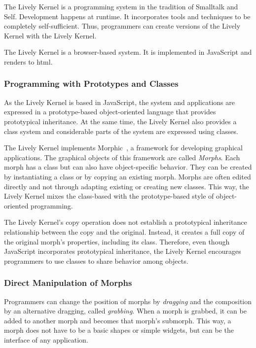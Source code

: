 The Lively Kernel is a programming system in the tradition of Smalltalk and Self.
Development happens at runtime.
It incorporates tools and techniques to be completely self-sufficient.
Thus, programmers can create versions of the Lively Kernel with the Lively Kernel.

The Lively Kernel is a browser-based system.
It is implemented in JavaScript and renders to \ac{html}.

\subsubsection{Programming with Prototypes and Classes}

As the Lively Kernel is based in JavaScript, the system and applications are expressed in a prototype-based object-oriented language that provides prototypical inheritance.
At the same time, the Lively Kernel also provides a class system and considerable parts of the system are expressed using classes.

The Lively Kernel implements Morphic~\cite{Maloney1995Mor}, a framework for developing graphical applications.
The graphical objects of this framework are called \emph{Morphs}.
Each morph has a class but can also have object-specific behavior.
They can be created by instantiating a class or by copying an existing morph.
Morphs are often edited directly and not through adapting existing or creating new classes.
This way, the Lively Kernel mixes the class-based with the prototype-based style of object-oriented programming.

The Lively Kernel's copy operation does not establish a prototypical inheritance relationship between the copy and the original.
Instead, it creates a full copy of the original morph's properties, including its class.
Therefore, even though JavaScript incorporates prototypical inheritance, the Lively Kernel encourages programmers to use classes to share behavior among objects.

\subsubsection{Direct Manipulation of Morphs}

Programmers can change the position of morphs by \emph{dragging} and the composition by an alternative dragging, called \emph{grabbing}.
When a morph is grabbed, it can be added to another morph and becomes that morph's submorph.
This way, a morph does not have to be a basic shapes or simple widgets, but can be the interface of any application.

